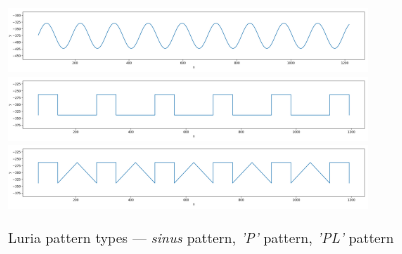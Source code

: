 \begin{figure}[htb]
  \centering
    \includegraphics[width=0.85\textwidth, trim=0cm 1.5cm 0cm 0cm] {images/luria/000}
    \includegraphics[width=0.85\textwidth, trim=0cm 1.5cm 0cm 0cm] {images/luria/001}
    \includegraphics[width=0.85\textwidth, trim=0cm 1.5cm 0cm 0cm] {images/luria/002}
    \caption{Luria pattern types --- \textit{sinus} pattern, \textit{'P'} pattern, \textit{'PL'} pattern}
    
    \label{luria}
\end{figure}